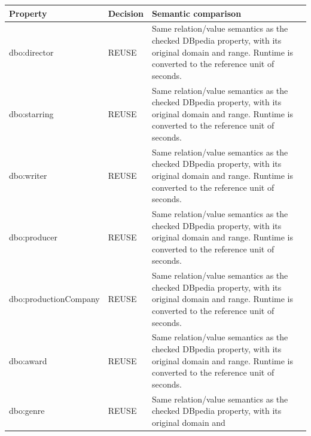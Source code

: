 \documentclass[
  11pt,
]{article}
\newcounter{none} %
\begin{document}
{\def\LTcaptype{none} %
\begin{longtable}[]{@{}
  >{\raggedright\arraybackslash}p{}
  >{\raggedright\arraybackslash}p{}
  >{\raggedright\arraybackslash}p{}@{}}
\toprule\noalign{}
\begin{minipage}[b]{\linewidth}\raggedright
Property
\end{minipage} & \begin{minipage}[b]{\linewidth}\raggedright
Decision
\end{minipage} & \begin{minipage}[b]{\linewidth}\raggedright
Semantic comparison
\end{minipage} \\
\midrule\noalign{}
\endhead
\bottomrule\noalign{}
\endlastfoot
dbo:director & REUSE & Same relation\allowbreak{}/\allowbreak{}value
semantics as the checked DBpedia property, with its original domain and
range. Runtime is converted to the reference unit of seconds. \\
dbo:starring & REUSE & Same relation\allowbreak{}/\allowbreak{}value
semantics as the checked DBpedia property, with its original domain and
range. Runtime is converted to the reference unit of seconds. \\
dbo:writer & REUSE & Same relation\allowbreak{}/\allowbreak{}value
semantics as the checked DBpedia property, with its original domain and
range. Runtime is converted to the reference unit of seconds. \\
dbo:producer & REUSE & Same relation\allowbreak{}/\allowbreak{}value
semantics as the checked DBpedia property, with its original domain and
range. Runtime is converted to the reference unit of seconds. \\
dbo:\allowbreak{}prod\allowbreak{}uction\allowbreak{}Co\allowbreak{}mpany
& REUSE & Same relation\allowbreak{}/\allowbreak{}value semantics as the
checked DBpedia property, with its original domain and range. Runtime is
converted to the reference unit of seconds. \\
dbo:award & REUSE & Same relation\allowbreak{}/\allowbreak{}value
semantics as the checked DBpedia property, with its original domain and
range. Runtime is converted to the reference unit of seconds. \\
dbo:genre & REUSE & Same relation\allowbreak{}/\allowbreak{}value
semantics as the checked DBpedia property, with its original domain and

\end{longtable}}
\end{document}

